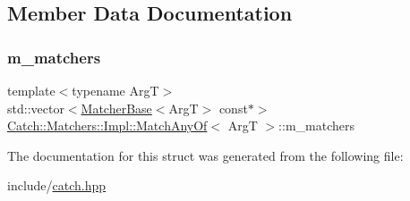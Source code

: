 \subsection{Member Data Documentation}
\mbox{\label{struct_catch_1_1_matchers_1_1_impl_1_1_match_any_of_a1fb1119e6110dc15b8d5262ec0aeddd5}} 
\subsubsection{\texorpdfstring{m\+\_\+matchers}{m\_matchers}}
{\footnotesize\ttfamily template$<$typename ArgT$>$ \\
std\+::vector$<$\mbox{\hyperlink{struct_catch_1_1_matchers_1_1_impl_1_1_matcher_base}{Matcher\+Base}}$<$ArgT$>$ const$\ast$$>$ \mbox{\hyperlink{struct_catch_1_1_matchers_1_1_impl_1_1_match_any_of}{Catch\+::\+Matchers\+::\+Impl\+::\+Match\+Any\+Of}}$<$ ArgT $>$\+::m\+\_\+matchers}



The documentation for this struct was generated from the following file\+:\begin{DoxyCompactItemize}
\item 
include/\mbox{\hyperlink{catch_8hpp}{catch.\+hpp}}\end{DoxyCompactItemize}
